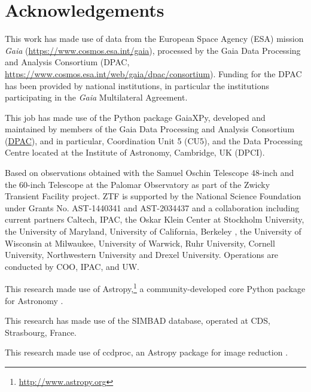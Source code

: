 \documentclass{sty/uanl}
\newcommand{\citeyearparen}[1]{\textcite{#1}}
\begin{document}






\appendix


\chapter*{Acknowledgements}
This work has made use of data from the European Space Agency (ESA) mission
\textit{Gaia} (\url{https://www.cosmos.esa.int/gaia}), processed by the Gaia
Data Processing and Analysis Consortium (DPAC,
\url{https://www.cosmos.esa.int/web/gaia/dpac/consortium}). Funding for the DPAC
has been provided by national institutions, in particular the institutions
participating in the {\it Gaia} Multilateral Agreement.

This job has made use of the Python package GaiaXPy, developed and maintained by
members of the Gaia Data Processing and Analysis Consortium
(\href{https://www.cosmos.esa.int/web/gaia/dpac/consortium}{DPAC}), and in
particular, Coordination Unit 5 (CU5), and the Data Processing Centre located at
the Institute of Astronomy, Cambridge, UK (DPCI).

Based on observations obtained with the Samuel Oschin Telescope 48-inch and the 60-inch Telescope at the Palomar
Observatory as part of the Zwicky Transient Facility project. ZTF is supported by the National Science Foundation under Grants
No. AST-1440341 and AST-2034437 and a collaboration including current partners Caltech, IPAC, the Oskar Klein Center at
Stockholm University, the University of Maryland, University of California, Berkeley , the University of Wisconsin at Milwaukee,
University of Warwick, Ruhr University, Cornell University, Northwestern University and Drexel University. Operations are
conducted by COO, IPAC, and UW.

This research made use of Astropy,\footnote{\url{http://www.astropy.org}} a
community-developed core Python package for Astronomy \citeyearparen{astropy}.

This research has made use of the SIMBAD database, operated at CDS, Strasbourg, France.

This research made use of ccdproc, an Astropy package for
image reduction \citeyearparen{ccdproc241}.
\clearpage

\printbibliography
\label{lastpage}
\end{document}
